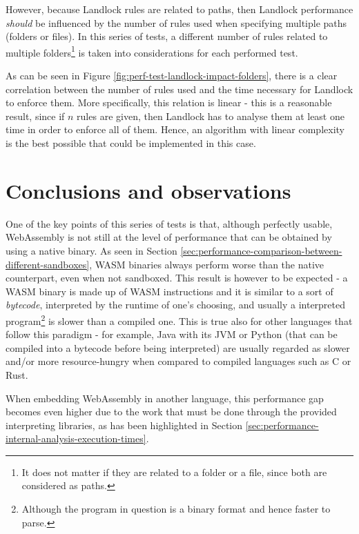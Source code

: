 However, because Landlock rules are related to paths, then Landlock performance \textit{should} be influenced by the
number of rules used when specifying multiple paths (folders or files).
In this series of tests, a different number of rules related to multiple folders\footnote{It does not matter if they are
related to a folder or a file, since both are considered as paths.} is taken into considerations
for each performed test.

As can be seen in Figure \ref{fig:perf-test-landlock-impact-folders}, there is a clear correlation
between the number of rules used and the time necessary for Landlock to enforce them.
More specifically, this relation is linear - this is a reasonable result, since if $n$ rules are given,
then Landlock has to analyse them at least one time in order to enforce all of them.
Hence, an algorithm with linear complexity is the best possible that could be implemented
in this case.

\section{Conclusions and observations}

One of the key points of this series of tests is that, although perfectly usable,
WebAssembly is not still at the level of performance that can be obtained by using a native binary.
As seen in Section \ref{sec:performance-comparison-between-different-sandboxes}, WASM binaries
always perform worse than the native counterpart, even when not sandboxed.
This result is however to be expected - a WASM binary is made up of WASM instructions and
it is similar to a sort of \textit{bytecode}, interpreted by the runtime of one's choosing,
and usually a interpreted program\footnote{Although the program in question is a binary format and hence faster to parse.}
is slower than a compiled one.
This is true also for other languages that follow this paradigm - for example, Java with its JVM
or Python (that can be compiled into a bytecode before being interpreted) are usually regarded as
slower and/or more resource-hungry when compared to compiled languages such as C or Rust.

When embedding WebAssembly in another language, this performance gap becomes even higher due to
the work that must be done through the provided interpreting libraries, as has been
highlighted in Section \ref{sec:performance-internal-analysis-execution-times}.


